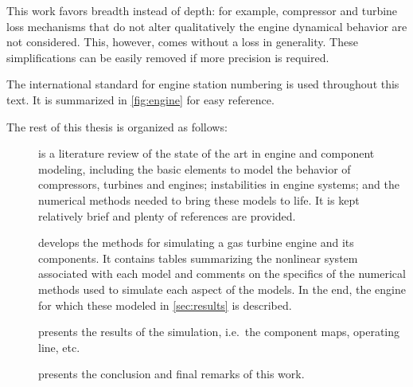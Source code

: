 \documentclass[tcc]{subfiles}
\begin{document}
This work favors breadth instead of depth: 
for example, compressor and turbine loss mechanisms that do not alter qualitatively the engine dynamical behavior are not considered. 
This, however, comes without a loss in generality. 
These simplifications can be easily removed if more precision is required.

The international standard for engine station numbering \cite{ARP755A} is used throughout this text. 
It is summarized in \cref{fig:engine} for easy reference.

The rest of this thesis is organized as follows: 
\begin{description}
    \item[] is a literature review of the state of the art in engine and component modeling, 
        including the basic elements to model the behavior of compressors, turbines and engines; 
        instabilities in engine systems; and the numerical methods needed to bring these models to life. 
        It is kept relatively brief and plenty of references are provided.
    \item[] develops the methods for simulating a gas turbine engine and its components. 
        It contains tables summarizing the nonlinear system associated with each model 
        and comments on the specifics of the numerical methods used to simulate each aspect of the models. 
        In the end, the engine for which these modeled in \cref{sec:results} is described.
    \item[] presents the results of the simulation, i.e.\ the component maps, operating line, etc.
    \item[] presents the conclusion and final remarks of this work.
\end{description}
\end{document}
